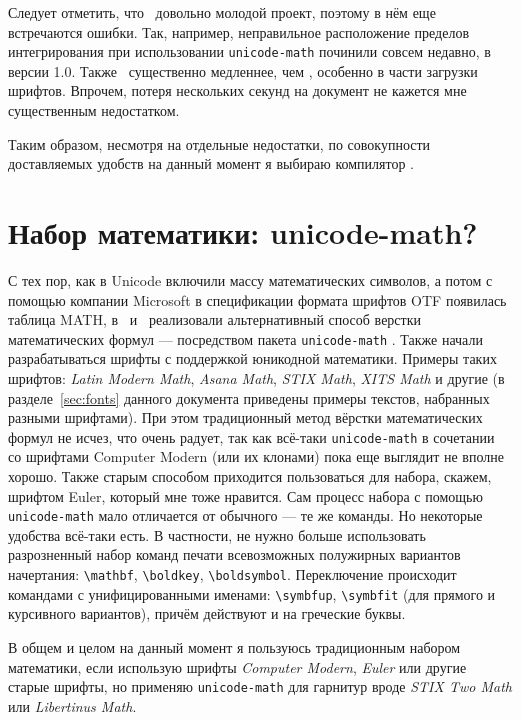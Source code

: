\documentclass[a4paper,12pt,hyphens]{article}
\newcommand\package[1]{\texttt{#1}}
\begin{document}
Следует отметить, что \LuaTeX\ довольно молодой проект, поэтому в нём еще
встречаются ошибки. Так, например, неправильное расположение пределов
интегрирования при использовании \package{unicode-math} починили совсем недавно,
в версии 1.0. Также \LuaTeX\ существенно медленнее, чем \pdfTeX, особенно в части
загрузки шрифтов. Впрочем, потеря нескольких секунд на документ не кажется мне
существенным недостатком.

Таким образом, несмотря на отдельные недостатки, по совокупности доставляемых
удобств на данный момент я выбираю компилятор \LuaTeX.

\section{Набор математики: unicode-math?}
С тех пор, как в Unicode включили массу математических символов, а потом с
помощью компании Microsoft в спецификации формата шрифтов OTF
появилась таблица MATH, в \LuaLaTeX\ и \XeTeX\ реализовали альтернативный
способ верстки математических формул --- посредством пакета
\package{unicode-math} \parencite{ctan-unicode-math}.
Также начали разрабатываться шрифты с поддержкой юникодной математики. Примеры таких
шрифтов: \emph{Latin Modern Math}, \emph{Asana Math}, \emph{STIX Math},
\emph{XITS Math} и другие (в разделе~\ref{sec:fonts} данного документа приведены
примеры текстов, набранных разными шрифтами).
При этом традиционный метод вёрстки математических формул не исчез, что
очень радует, так как всё-таки \package{unicode-math} в сочетании со шрифтами
Computer Modern (или их клонами) пока еще выглядит не вполне хорошо.
Также старым способом приходится пользоваться для набора, скажем, шрифтом
Euler, который мне тоже нравится. Сам процесс набора с помощью \package{unicode-math}
мало отличается от обычного --- те же команды. Но некоторые удобства всё-таки
есть. В частности, не нужно больше использовать разрозненный набор команд
печати всевозможных полужирных вариантов начертания: \verb|\mathbf|, \verb|\boldkey|,
\verb|\boldsymbol|. Переключение происходит командами с унифицированными именами:
\verb|\symbfup|, \verb|\symbfit| (для прямого и курсивного вариантов), причём
действуют и на греческие буквы.

В общем и целом на данный момент я пользуюсь традиционным набором математики,
если использую шрифты \emph{Computer Modern}, \emph{Euler} или другие старые шрифты, но
применяю \package{unicode-math} для гарнитур вроде \emph{STIX Two Math} или
\emph{Libertinus Math}.
\end{document}
